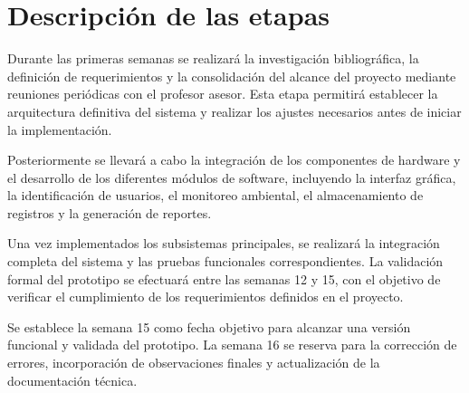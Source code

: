 \section{Descripción de las etapas}

Durante las primeras semanas se realizará la investigación bibliográfica, la definición de
requerimientos y la consolidación del alcance del proyecto mediante reuniones periódicas
con el profesor asesor. Esta etapa permitirá establecer la arquitectura definitiva del sistema
y realizar los ajustes necesarios antes de iniciar la implementación.

Posteriormente se llevará a cabo la integración de los componentes de hardware y el
desarrollo de los diferentes módulos de software, incluyendo la interfaz gráfica, la
identificación de usuarios, el monitoreo ambiental, el almacenamiento de registros y la
generación de reportes.

Una vez implementados los subsistemas principales, se realizará la integración completa
del sistema y las pruebas funcionales correspondientes. La validación formal del prototipo
se efectuará entre las semanas 12 y 15, con el objetivo de verificar el cumplimiento de los
requerimientos definidos en el proyecto.

Se establece la semana 15 como fecha objetivo para alcanzar una versión funcional y
validada del prototipo. La semana 16 se reserva para la corrección de errores,
 incorporación de observaciones finales y actualización de la documentación técnica.


